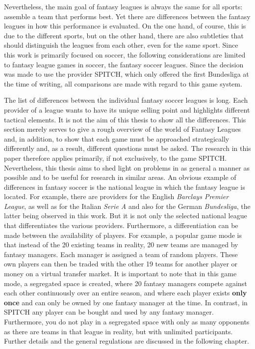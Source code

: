Nevertheless, the main goal of fantasy leagues is always the same for all sports: assemble a team that performs best. Yet there are differences between the fantasy leagues in how this performance is evaluated. On the one hand, of course, this is due to the different sports, but on the other hand, there are also subtleties that should distinguish the leagues from each other, even for the same sport. Since this work is primarily focused on soccer, the following considerations are limited to fantasy league games in soccer, the fantasy soccer leagues. Since the decision was made to use the provider SPITCH, which only offered the first Bundesliga at the time of writing, all comparisons are made with regard to this game system. 

The list of differences between the individual fantasy soccer leagues is long. Each provider of a league wants to have its unique selling point and highlights different tactical elements. It is not the aim of this thesis to show all the differences. This section merely serves to give a rough overview of the world of Fantasy Leagues and, in addition, to show that each game must be approached strategically differently and, as a result, different questions must be asked. The research in this paper therefore applies primarily, if not exclusively, to the game SPITCH. Nevertheless, this thesis aims to shed light on problems in as general a manner as possible and to be useful for research in similar areas. An obvious example of differences in fantasy soccer is the national league in which the fantasy league is located. For example, there are providers for the English \emph{Barclays Premier League}, as well as for the Italian \emph{Serie A} and also for the German \emph{Bundesliga}, the latter being observed in this work. But it is not only the selected national league that differentiates the various providers. Furthermore, a differentiation can be made between the availability of players. For example, a popular game mode is that instead of the 20 existing teams in reality, 20 new teams are managed by fantasy managers. Each manager is assigned a team of random players. These own players can then be traded with the other 19 teams for another player or money on a virtual transfer market. It is important to note that in this game mode, a segregated space is created, where 20 fantasy managers compete against each other continuously over an entire season, and where each player exists \textbf{only once} and can only be owned by one fantasy manager at the time. In contrast, in SPITCH any player can be bought and used by any fantasy manager. Furthermore, you do not play in a segregated space with only as many opponents as there are teams in that league in reality, but with unlimited participants. Further details and the general regulations are discussed in the following chapter.